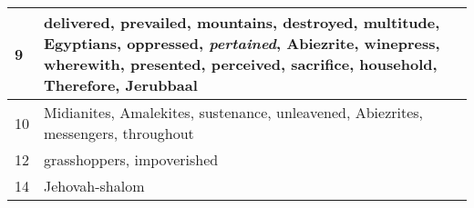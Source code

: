 \begin{center}
\begin{longtable}{l|p{3.75in}}
9 & delivered, prevailed, mountains, destroyed, multitude, Egyptians, oppressed, \emph{pertained}, Abiezrite, winepress, wherewith, presented, perceived, sacrifice, household, Therefore, Jerubbaal\\ \hline 
10 & Midianites, Amalekites, sustenance, unleavened, Abiezrites, messengers, throughout\\ \hline 
12 & grasshoppers, impoverished\\ \hline 
14 & Jehovah-shalom\\ \hline 
\end{longtable}
\end{center}





